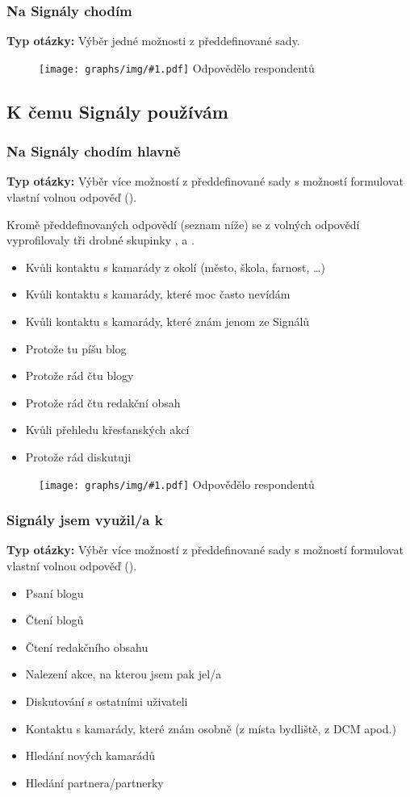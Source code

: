 \documentclass[12pt, a4paper, twoside]{article}
\newcommand{\answercount}[1]{Odpovědělo  respondentů}
\newcommand{\includegraph}[2]{
  \begin{figure}[H]
    \centering
    \textbf{#2}
    \texttt{[image: graphs/img/\#1.pdf]}
    \answercount{#1}
  \end{figure}
}
\newcommand{\qtype}{\textbf{Typ otázky:}
}
\newcommand{\pickOne}{Výběr jedné možnosti z předdefinované sady\xspace}
\newcommand{\pickMultiple}{Výběr více možností z předdefinované sady\xspace}
\newcommand{\withOther}{s možností formulovat vlastní volnou odpověď (\uv{Jiné})\xspace}
\begin{document}
\subsubsection{Na Signály chodím}

\qtype \pickOne.

\includegraph{na_signaly_chodim}{}

\subsection{K čemu Signály používám}\label{sec:kcemu}

\subsubsection{Na Signály chodím hlavně}

\qtype \pickMultiple \withOther.

Kromě předdefinovaných odpovědí (seznam níže)
se z volných odpovědí vyprofilovaly tři drobné skupinky
,  a .

\begin{itemize}
\item Kvůli kontaktu s kamarády z okolí (město, škola, farnost, …)
\item Kvůli kontaktu s kamarády, které moc často nevídám
\item Kvůli kontaktu s kamarády, které znám jenom ze Signálů
\item Protože tu píšu blog
\item Protože rád čtu blogy
\item Protože rád čtu redakční obsah
\item Kvůli přehledu křesťanských akcí
\item Protože rád diskutuji
\end{itemize}

\includegraph{na_signaly_chodim_hlavne}{}

\subsubsection{Signály jsem využil/a k}

\qtype \pickMultiple \withOther.

\begin{itemize}
\item Psaní blogu
\item Čtení blogů
\item Čtení redakčního obsahu
\item Nalezení akce, na kterou jsem pak jel/a
\item Diskutování s ostatními uživateli
\item Kontaktu s kamarády, které znám osobně (z místa bydliště, z DCM apod.)
\item Hledání nových kamarádů
\item Hledání partnera/partnerky
\end{itemize}
\end{document}
